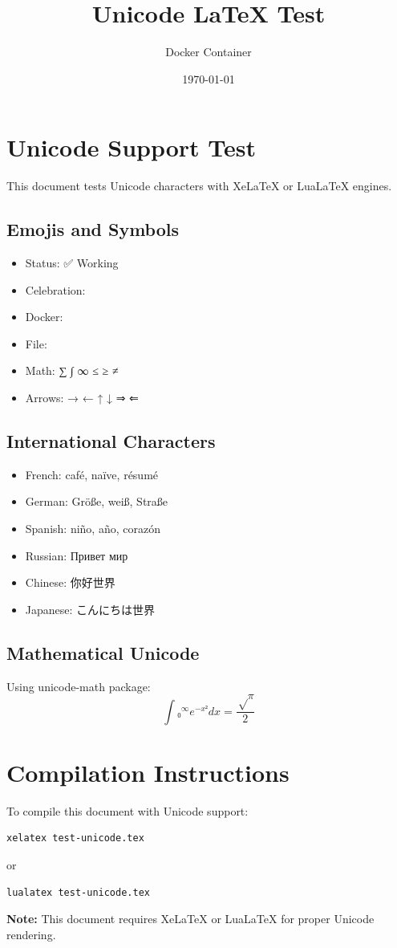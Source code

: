 \documentclass[12pt,a4paper]{article}
\title{Unicode LaTeX Test}
\author{Docker Container}
\date{\today}
\begin{document}
\maketitle

\section{Unicode Support Test}
This document tests Unicode characters with XeLaTeX or LuaLaTeX engines.

\subsection{Emojis and Symbols}
\begin{itemize}
    \item Status: ✅ Working
    \item Celebration: 🎉
    \item Docker: 🐳
    \item File: 📄
    \item Math: ∑ ∫ ∞ ≤ ≥ ≠
    \item Arrows: → ← ↑ ↓ ⇒ ⇐
\end{itemize}

\subsection{International Characters}
\begin{itemize}
    \item French: café, naïve, résumé
    \item German: Größe, weiß, Straße
    \item Spanish: niño, año, corazón
    \item Russian: Привет мир
    \item Chinese: 你好世界
    \item Japanese: こんにちは世界
\end{itemize}

\subsection{Mathematical Unicode}
Using unicode-math package:
\begin{equation}
∫₀^∞ e^{-x²} dx = \frac{√π}{2}
\end{equation}

\section{Compilation Instructions}
To compile this document with Unicode support:
\begin{verbatim}
xelatex test-unicode.tex
\end{verbatim}
or
\begin{verbatim}
lualatex test-unicode.tex
\end{verbatim}

\textbf{Note:} This document requires XeLaTeX or LuaLaTeX for proper Unicode rendering.
\end{document}
